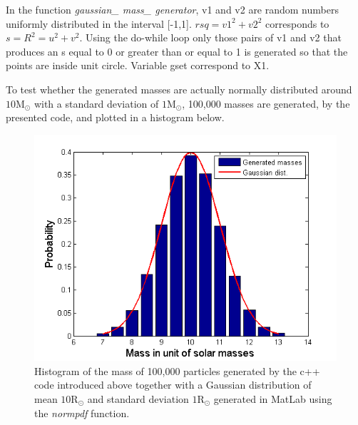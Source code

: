 In the function \textit{gaussian\_ mass\_ generator}, v1 and v2 are random numbers uniformly distributed in the interval [-1,1]. $rsq = v1^2 + v2^2$  corresponds to $s = R ^2 = u^2 + v^2$. 
Using the do-while loop only those pairs of v1 and v2 that produces an s equal to 0 or greater than or equal to 1 is generated so that the points are inside unit circle.  Variable gset  correspond to X1.

To test whether the generated masses are actually normally distributed around $10\text{M}_{\odot}$ with a standard deviation of $1\text{M}_{\odot}$, 100,000 masses are generated, by the presented code, and plotted in a histogram below. 
\begin{figure}[H]
\centering
	\includegraphics[width=0.7\linewidth]{Figures/random_mass_test.png}
\caption{
Histogram of the mass of 100,000 particles generated by the c++ code introduced above together with a Gaussian distribution of mean $10 \text{R}_{\odot}$ and standard deviation $1 \text{R}_{\odot}$ generated in MatLab using the \textit{normpdf} function. 
}
\label{fig:GaussianGeneratedMass}
\end{figure}

